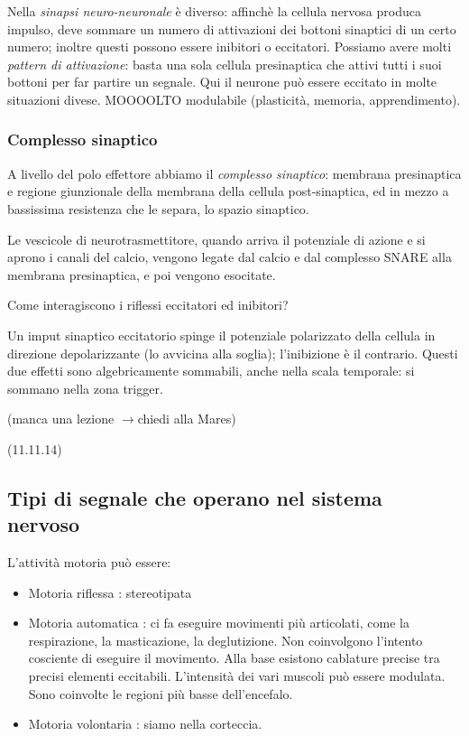 \documentclass[a4paper,12pt]{article}
\newcommand{\lfreccia}{\ensuremath{\longrightarrow}}
\begin{document}
Nella \emph{sinapsi neuro-neuronale} è diverso: affinchè la cellula nervosa produca impulso, deve sommare un numero di attivazioni dei bottoni sinaptici di un certo numero; inoltre questi possono essere inibitori o eccitatori. Possiamo avere molti \emph{pattern di attivazione}: basta una sola cellula presinaptica che attivi tutti i suoi bottoni per far partire un segnale. Qui il neurone può essere eccitato in molte situazioni divese. MOOOOLTO modulabile (plasticità, memoria, apprendimento).

\subsubsection{Complesso sinaptico}
A livello del polo effettore abbiamo il \emph{complesso sinaptico}: membrana presinaptica e regione giunzionale della membrana della cellula post-sinaptica, ed in mezzo a bassissima resistenza che le separa, lo spazio sinaptico.

Le vescicole di neurotrasmettitore, quando arriva il potenziale di azione e si aprono i canali del calcio, vengono legate dal calcio e dal complesso SNARE alla membrana presinaptica, e poi vengono esocitate.

Come interagiscono i riflessi eccitatori ed inibitori?

Un imput sinaptico eccitatorio spinge il potenziale polarizzato della cellula in direzione depolarizzante (lo avvicina alla soglia); l'inibizione è il contrario.
Questi due effetti sono algebricamente sommabili, anche nella scala temporale: si sommano nella zona trigger. 

(manca una lezione \lfreccia chiedi alla Mares)

(11.11.14)

\subsection{Tipi di segnale che operano nel sistema nervoso}
L'attività motoria può essere:
\begin{itemize}
\item{Motoria riflessa : stereotipata}
\item{Motoria automatica : ci fa eseguire movimenti più articolati, come la respirazione, la masticazione, la deglutizione. Non coinvolgono l'intento cosciente di eseguire il movimento. Alla base esistono cablature precise tra precisi elementi eccitabili. L'intensità dei vari muscoli può essere modulata. Sono coinvolte le regioni più basse dell'encefalo.}
\item{Motoria volontaria : siamo nella corteccia.}
\end{itemize}
\end{document}
